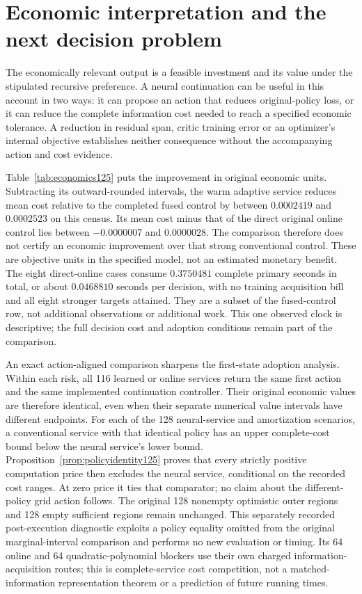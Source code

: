 \section{Economic interpretation and the next decision problem}
\label{sec:discussion125}

The economically relevant output is a feasible investment and its value
under the stipulated recursive preference. A neural continuation can be
useful in this account in two ways: it can propose an action that reduces
original-policy loss, or it can reduce the complete information cost needed
to reach a specified economic tolerance. A reduction in residual span,
critic training error or an optimizer's internal objective establishes
neither consequence without the accompanying action and cost evidence.

Table~\ref{tab:economics125} puts the improvement in original economic
units. Subtracting its outward-rounded intervals, the warm adaptive
service reduces mean cost relative to the completed fused control by
between $0.0002419$ and $0.0002523$ on this census. Its mean cost minus
that of the direct original online control lies between $-0.0000007$
and $0.0000028$. The comparison therefore does not certify an economic
improvement over that strong conventional control. These are objective
units in the specified model, not an estimated monetary benefit.
The eight direct-online cases consume $0.3750481$ complete primary
seconds in total, or about $0.0468810$ seconds per decision, with no
training acquisition bill and all eight stronger targets attained.
They are a subset of the fused-control row, not additional observations
or additional work. This one observed clock is descriptive; the full
decision cost and adoption conditions remain part of the comparison.

An exact action-aligned comparison sharpens the first-state adoption
analysis. Within each risk, all 116 learned or online services return the
same first action and the same implemented continuation controller.
Their original economic values are therefore identical, even when their
separate numerical value intervals have different endpoints. For each
of the 128 neural-service and amortization scenarios, a conventional
service with that identical policy has an upper complete-cost bound below
the neural service's lower bound. Proposition~\ref{prop:policyidentity125}
proves that every strictly positive computation price then excludes the
neural service, conditional on the recorded cost ranges. At zero price
it ties that comparator; no claim about the different-policy grid action
follows. The original 128 nonempty optimistic outer regions and 128 empty
sufficient regions remain unchanged. This separately recorded
post-execution diagnostic exploits a policy equality omitted from the
original marginal-interval comparison and performs no new evaluation or
timing. Its 64 online and 64 quadratic-polynomial blockers use their own
charged information-acquisition routes; this is complete-service cost
competition, not a matched-information representation theorem or a
prediction of future running times.

